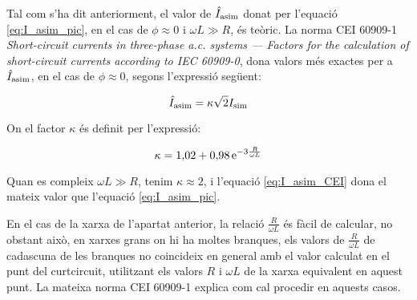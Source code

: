 Tal com s'ha dit anteriorment, el valor de $\hat{I}_\mathrm{asim}$ donat per l'equació \eqref{eq:I_asim_pic}, en el cas de $\phi \approx 0$ i $\omega L\gg R$, és teòric. La norma CEI 60909-1 \textit{Short-circuit currents in three-phase a.c. systems ---  Factors for the calculation of short-circuit currents according to IEC 60909-0}, dona valors més exactes per a $\hat{I}_\mathrm{asim}$, en el cas de $\phi \approx 0$, segons l'expressió següent:

\begin{equation}
    \hat{I}_\mathrm{asim} = \kappa \sqrt{2} I_\mathrm{sim} \label{eq:I_asim_CEI}
\end{equation}

On el factor $\kappa$ és definit per l'expressió:

\begin{equation}
    \kappa = 1{,}02 + 0{,}98 \,\mathrm{e}^{-3\frac{R}{\omega L}}\label{eq:kappa_CEI}
\end{equation}

Quan es compleix $\omega L\gg R$, tenim $\kappa \approx 2$, i l'equació \eqref{eq:I_asim_CEI} dona el mateix valor que l'equació \eqref{eq:I_asim_pic}.

En el cas de la xarxa de l'apartat anterior, la relació $\frac{R}{\omega L}$ és fàcil de  calcular, no obstant això, en xarxes grans on hi ha moltes branques, els valors de $\frac{R}{\omega L}$ de cadascuna de les branques no coincideix en general amb el valor calculat en el punt del curtcircuit, utilitzant els valors $R$ i $\omega L$ de la xarxa equivalent en aquest punt. La mateixa norma CEI 60909-1 explica com cal procedir en aquests casos.


